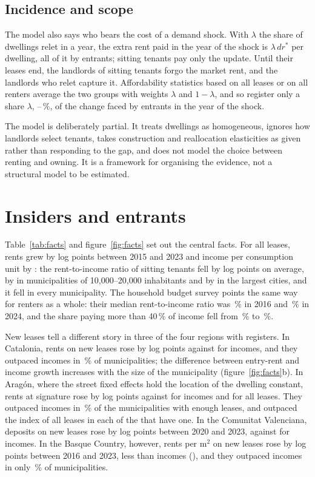 \documentclass[11pt,a4paper]{article}
\begin{document}
\subsection{Incidence and scope}

The model also says who bears the cost of a demand shock. With $\lambda$ the share of dwellings relet in a year, the extra rent paid in the year of the shock is $\lambda\,dr^*$ per dwelling, all of it by entrants; sitting tenants pay only the update. Until their leases end, the landlords of sitting tenants forgo the market rent, and the landlords who relet capture it. Affordability statistics based on all leases or on all renters average the two groups with weights $\lambda$ and $1-\lambda$, and so register only a share $\lambda$, \mcAoneLo--\mcAoneHi\,\%, of the change faced by entrants in the year of the shock.

The model is deliberately partial. It treats dwellings as homogeneous, ignores how landlords select tenants, takes construction and reallocation elasticities as given rather than responding to the gap, and does not model the choice between renting and owning. It is a framework for organising the evidence, not a structural model to be estimated.

\section{Insiders and entrants}\label{sec:facts}

Table~\ref{tab:facts} and figure~\ref{fig:facts} set out the central facts. For all leases, rents grew by \insR{} log points between 2015 and 2023 and income per consumption unit by \insY: the rent-to-income ratio of sitting tenants fell by \insGapAbs{} log points on average, by \insGapAAbs{} in municipalities of 10,000--20,000 inhabitants and by \insGapEAbs{} in the largest cities, and it fell in every municipality. The household budget survey points the same way for renters as a whole: their median rent-to-income ratio was \epfBurdOne\,\% in 2016 and \epfBurdNine\,\% in 2024, and the share paying more than 40\,\% of income fell from \epfOverOne\,\% to \epfOverNine\,\%.

New leases tell a different story in three of the four regions with registers. In Catalonia, rents on new leases rose by \catR{} log points against \catY{} for incomes, and they outpaced incomes in \catShare\,\% of municipalities; the difference between entry-rent and income growth increases with the size of the municipality (figure~\ref{fig:facts}b). In Aragón, where the street fixed effects hold the location of the dwelling constant, rents at signature rose by \araR{} log points against \araY{} for incomes and \araS{} for all leases. They outpaced incomes in \araShare\,\% of the \araN{} municipalities with enough leases, and outpaced the index of all leases in each of the \araNs{} that have one. In the Comunitat Valenciana, deposits on new leases rose by \valR{} log points between 2020 and 2023, against \valY{} for incomes. In the Basque Country, however, rents per m$^2$ on new leases rose by \basR{} log points between 2016 and 2023, less than incomes (\basY), and they outpaced incomes in only \basShare\,\% of municipalities.
\end{document}
